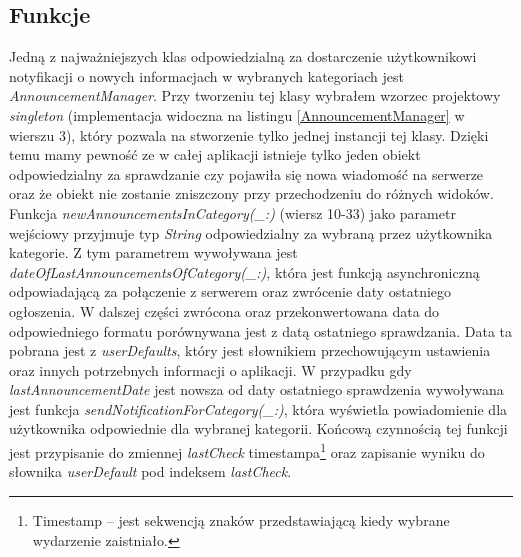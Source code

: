 \documentclass{iiuwb}
\begin{document}
\subsection{Funkcje}
Jedną z najważniejszych klas odpowiedzialną za dostarczenie użytkownikowi notyfikacji o nowych informacjach w wybranych kategoriach jest \textit{AnnouncementManager}. Przy tworzeniu tej klasy wybrałem wzorzec projektowy \textit{singleton} (implementacja widoczna na listingu \ref{AnnouncementManager} w wierszu 3), który pozwala na stworzenie tylko jednej instancji tej klasy. Dzięki temu mamy pewność ze w całej aplikacji istnieje tylko jeden obiekt odpowiedzialny za sprawdzanie czy pojawiła się nowa wiadomość na serwerze oraz że obiekt nie zostanie zniszczony przy przechodzeniu do różnych widoków. Funkcja \textit{newAnnouncementsInCategory(\_:)} (wiersz 10-33) jako parametr wejściowy przyjmuje typ \textit{String} odpowiedzialny za wybraną przez użytkownika kategorie. Z tym parametrem wywoływana jest \textit{dateOfLastAnnouncementsOfCategory(\_:)}, która jest funkcją asynchroniczną odpowiadającą za połączenie z serwerem oraz zwrócenie daty ostatniego ogłoszenia. W dalszej części zwrócona oraz przekonwertowana data do odpowiedniego formatu porównywana jest z datą ostatniego sprawdzania. Data ta pobrana jest z \textit{userDefaults}, który jest słownikiem  przechowującym ustawienia oraz innych potrzebnych informacji o aplikacji. W przypadku gdy \textit{lastAnnouncementDate} jest nowsza od daty ostatniego sprawdzenia wywoływana jest funkcja \textit{sendNotificationForCategory(\_:)}, która wyświetla powiadomienie dla użytkownika odpowiednie dla wybranej kategorii. Końcową czynnością tej funkcji jest przypisanie do zmiennej \textit{lastCheck} timestampa\footnote{Timestamp -- jest sekwencją znaków przedstawiającą kiedy wybrane wydarzenie zaistniało.} oraz zapisanie wyniku do słownika \textit{userDefault} pod indeksem \textit{lastCheck}.
\newpage
\end{document}

